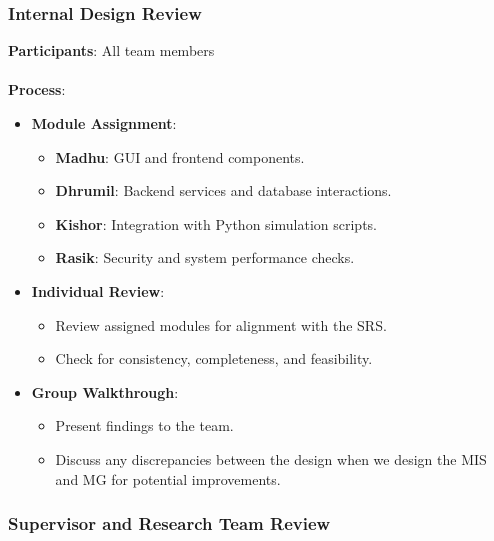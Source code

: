 \documentclass[12pt, titlepage]{article}
\begin{document}
\subsubsection{Internal Design Review}

\textbf{Participants}: All team members
\\\\
\textbf{Process}:
\begin{itemize}
    \item \textbf{Module Assignment}:
    \begin{itemize}
        \item \textbf{Madhu}: GUI and frontend components.
        \item \textbf{Dhrumil}: Backend services and database interactions.
        \item \textbf{Kishor}: Integration with Python simulation scripts.
        \item \textbf{Rasik}: Security and system performance checks.
    \end{itemize}
    \item \textbf{Individual Review}:
    \begin{itemize}
        \item Review assigned modules for alignment with the SRS.
        \item Check for consistency, completeness, and feasibility.
    \end{itemize}
    \item \textbf{Group Walkthrough}:
    \begin{itemize}
        \item Present findings to the team.
        \item Discuss any discrepancies between the design when we design the MIS and MG for potential improvements.
    \end{itemize}
\end{itemize}

\subsubsection{Supervisor and Research Team Review}
\end{document}
